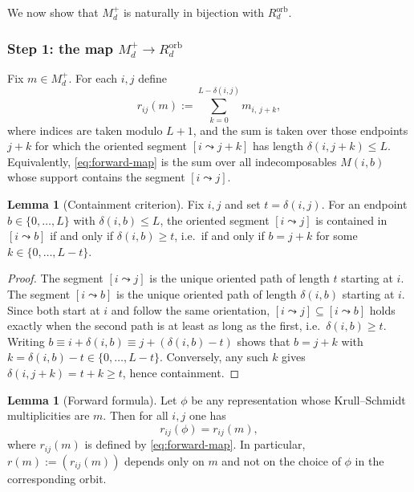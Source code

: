 \documentclass{article}
\theoremstyle{definition}
\newtheorem{lemma}[theorem]{Lemma}
\begin{document}
\medskip

We now show that $M_d^+$ is naturally in bijection with $R_d^{\mathrm{orb}}$.

\subsubsection*{Step 1: the map $M_d^+\to R_d^{\mathrm{orb}}$}
Fix $m\in M_d^+$.
For each $i,j$ define
\begin{equation}\label{eq:forward-map}
r_{ij}(m)
:=
\sum_{k=0}^{L-\delta(i,j)} m_{i,\,j+k},
\end{equation}
where indices are taken modulo $L+1$, and the sum is taken over those
endpoints $j+k$ for which the oriented segment $[i\leadsto j+k]$
has length $\delta(i,j+k)\le L$.
Equivalently, \eqref{eq:forward-map} is the sum over all indecomposables
$M(i,b)$ whose support contains the segment $[i\leadsto j]$.

\begin{lemma}[Containment criterion]\label{lem:containment}
Fix $i,j$ and set $t=\delta(i,j)$.
For an endpoint $b\in\{0,\dots,L\}$ with $\delta(i,b)\le L$,
the oriented segment $[i\leadsto j]$ is contained in $[i\leadsto b]$
if and only if $\delta(i,b)\ge t$, i.e.\ if and only if $b=j+k$ for some
$k\in\{0,\dots,L-t\}$.
\end{lemma}

\begin{proof}
The segment $[i\leadsto j]$ is the unique oriented path of length $t$ starting
at $i$. The segment $[i\leadsto b]$ is the unique oriented path of length
$\delta(i,b)$ starting at $i$. Since both start at $i$ and follow the same
orientation, $[i\leadsto j]\subseteq [i\leadsto b]$ holds exactly when the
second path is at least as long as the first, i.e.\ $\delta(i,b)\ge t$.
Writing $b\equiv i+\delta(i,b)\equiv j+(\delta(i,b)-t)$ shows that
$b=j+k$ with $k=\delta(i,b)-t\in\{0,\dots,L-t\}$. Conversely, any such $k$
gives $\delta(i,j+k)=t+k\ge t$, hence containment.
\end{proof}

\begin{lemma}[Forward formula]\label{lem:forward-formula}
Let $\phi$ be any representation whose Krull--Schmidt multiplicities are $m$.
Then for all $i,j$ one has
\[
r_{ij}(\phi)=r_{ij}(m),
\]
where $r_{ij}(m)$ is defined by \eqref{eq:forward-map}.
In particular, $r(m):=(r_{ij}(m))$ depends only on $m$ and not on the choice
of $\phi$ in the corresponding orbit.
\end{lemma}
\end{document}
